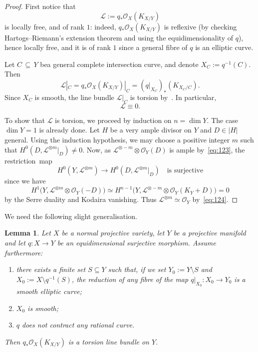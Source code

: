 \documentclass[11pt]{article}
\newtheorem{lemm}[theo]{Lemma}
\theoremstyle{definition}
\numberwithin{equation}{section}
\numberwithin{figure}{section}
\numberwithin{table}{section}
\newcommand\sL{\mathcal{L}}
\newcommand{\OO}{\mathcal{O}}
\begin{document}
\begin{proof}
First notice that
\[
\sL := q_*\OO_X(K_{X/Y})
\]
is locally free, and of rank $1$: indeed, $ q_*\OO_X(K_{X/Y}) $ is reflexive (by checking Hartogs--Riemann's extension theorem and using the equidimensionality of $q$), hence locally free, and it is of rank $1$ since a general fibre of $q$ is an elliptic curve.

Let $C\,\subseteq\,Y$ bea general complete intersection curve, and denote $X_C:=q^{-1}(C)$. Then
\[
\sL|_C = q_*\OO_X(K_{X/Y})|_C = (q|_{X_C})_*(K_{X_C/C}).
\]
Since $X_C$ is smooth, the line bundle $\sL|_C$ is torsion by~\cite[Theorem~III.18.3]{BHPV04}. In particular,
\begin{equation}\label{eq:123}
\sL \equiv 0.
\end{equation}

To show that $\sL$ is torsion, we proceed by induction on $n=\dim Y$. The case $\dim Y = 1$ is already done. Let $H$ be a very ample divisor on $Y$ and $D \in | H |$ general. Using the induction hypothesis, we may choose a positive integer $m$ such that $H^0(D, \sL^{\otimes m}|_D) \ne 0$. Now, as $\sL^{\otimes -m} \otimes \OO_Y(D)$ is ample by~\eqref{eq:123}, the restriction~map
\begin{equation}\label{eq:124}
H^0(Y,\sL^{\otimes m}) \to H^0(D, \sL^{\otimes m}|_D)\quad\text{is surjective}
\end{equation}
since we have
\[
H^1\big(Y,\sL^{\otimes m} \otimes \OO_Y(-D)\big)\simeq H^{n-1}\big(Y, \sL^{\otimes -m} \otimes \OO_Y(K_Y+D)\big) = 0
\]
by the Serre duality and Kodaira vanishing. Thus $\sL^{\otimes m} \simeq \OO_Y$ by~\eqref{eq:124}.
\end{proof}

We need the following slight generalisation.

\begin{lemm}\label{lem:flat-elliptic}
Let $X$ be a normal projective variety, let $Y$ be a projective manifold and let $q\colon X \to Y$ be an equidimensional surjective morphism. Assume furthermore:
\begin{enumerate}
\item \label{list-6.4.1} there exists a finite set $S \subseteq Y$ such that, if we set $Y_0:=Y \setminus S$ and $X_0:=X \setminus q^{-1}(S)$, the reduction of any fibre of the map $q|_{X_0}\colon X_0 \to Y_0$ is a smooth elliptic curve;
\item \label{list-6.4.2}$X_0$ is smooth;
\item \label{list-6.4.3}$q$ does not contract any rational curve.
\end{enumerate}
Then $q_*\OO_X({K_{X/Y}})$ is a torsion line bundle on $Y$.
\end{lemm}
\end{document}
